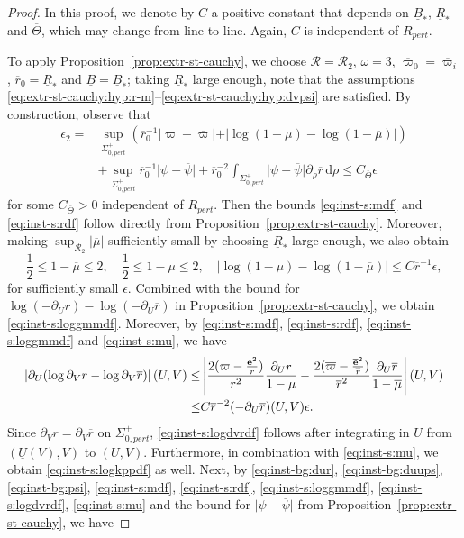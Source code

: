 \documentclass[10pt, reqno]{amsart}
\theoremstyle{definition}
\theoremstyle{remark}
\theoremstyle{conjecture}
\numberwithin{equation}{section}
\newcommand{\abs}[1]{\vert#1\vert}
\newcommand{\ud}{\mathrm{d}}
\newcommand{\rd}{\partial}
\newcommand{\0}{\emptyset}
\newcommand{\eps}{\epsilon}
\newcommand{\Sgm}{\Sigma}
\newcommand{\Tht}{\Theta}
\newcommand{\omg}{\omega}
\newcommand{\bfe}{{\bf e}}
\newcommand{\calR}{\mathcal R}
\newcommand{\e}{\bfe}							%
\newcommand{\psibg}{\overline{\psi}}				%
\newcommand{\rbg}{\overline{r}}					%
\newcommand{\varpibg}{\overline{\varpi}}				%
\newcommand{\mubg}{\overline{\mu}}				%
\newcommand{\ebg}{\overline{\e}}					%
\newcommand{\Abs}[1]{\left\vert #1 \right\vert}
\begin{document}
\begin{proof}
In this proof, we denote by $C$ a positive constant that depends on $\underline{B}_{\ast}$, $\underline{R}_{\ast}
$ and $\overline{\Tht}$, which may change from line to line. Again, $C$ is independent of $R_{pert}$.

To apply Proposition~\ref{prop:extr-st-cauchy}, we choose $\underline{\calR} = \calR_{2}$, $\omg = 3$, $\varpibg_{0} = \varpibg_{i}$, $\rbg_{0} = \underline{R}_{\ast}$ and $\underline{B} = \underline{B}_{\ast}$; taking $\underline{R}_{\ast}$ large enough, note that the assumptions \eqref{eq:extr-st-cauchy:hyp:r-m}--\eqref{eq:extr-st-cauchy:hyp:dvpsi} are satisfied. By construction, observe that
\begin{align*}
	\eps_{2} = & \sup_{\Sgm_{0, pert}^{+}} \left( \rbg_{0}^{-1} \abs{\varpi - \varpibg} + \abs{\log (1-\mu) - \log (1-\mubg)} \right) \\
	& + \sup_{\Sgm_{0, pert}^{+}} \rbg_{0}^{-1} \abs{\psi - \psibg}  + \rbg_{0}^{-2} \int_{\Sgm_{0, pert}^{+}} \abs{\psi - \psibg} \rd_{\rho} \rbg \, \ud \rho 
	\leq C_{\overline{\Tht}} \eps
\end{align*}
for some $C_{\overline{\Tht}} > 0$ independent of $R_{pert}$. Then the bounds \eqref{eq:inst-s:mdf} and \eqref{eq:inst-s:rdf} follow directly from Proposition~\ref{prop:extr-st-cauchy}. Moreover, making $\sup_{\calR_{2}} \abs{\mubg}$ sufficiently small by choosing $\underline{R}_{\ast}$ large enough, we also obtain
\begin{equation} \label{eq:inst-s:mu}
	\frac{1}{2} \leq 1 - \mubg \leq 2, \quad \frac{1}{2} \leq 1 - \mu \leq 2, \quad \Abs{\log(1 - \mu) - \log(1 - \mubg)} \leq C \rbg^{-1} \eps,
\end{equation}
for sufficiently small $\eps$. Combined with the bound for $\log (-\rd_{U} r) - \log (-\rd_{U} \rbg)$ in Proposition~\ref{prop:extr-st-cauchy}, we obtain \eqref{eq:inst-s:loggmmdf}. Moreover, by \eqref{eq:inst-s:mdf}, \eqref{eq:inst-s:rdf}, \eqref{eq:inst-s:loggmmdf} and \eqref{eq:inst-s:mu}, we have
\begin{align*}
	\Abs{\rd_{U} (\log \rd_{V} r - \log \rd_{V} \rbg)} (U,V)
	\leq & \Abs{\frac{2 (\varpi - \frac{\e^{2}}{r})}{r^{2}} \frac{\rd_{U} r}{1-\mu} - \frac{2 (\varpibg - \frac{\ebg^{2}}{\rbg})}{\rbg^{2}} \frac{\rd_{U} \rbg}{1-\mubg}} (U,V) \\
	\leq & C \rbg^{-2} (- \rd_{U} \rbg) (U, V) \eps.
\end{align*}
Since $\rd_{V} r = \rd_{V} \rbg$ on $\Sgm_{0, pert}^{+}$, \eqref{eq:inst-s:logdvrdf} follows after integrating in $U$ from $(\underline{U}(V), V)$ to $(U, V)$. Furthermore, in combination with \eqref{eq:inst-s:mu}, we obtain \eqref{eq:inst-s:logkppdf} as well. Next, by \eqref{eq:inst-bg:dur}, \eqref{eq:inst-bg:duups}, \eqref{eq:inst-bg:psi}, \eqref{eq:inst-s:mdf}, \eqref{eq:inst-s:rdf}, \eqref{eq:inst-s:loggmmdf}, \eqref{eq:inst-s:logdvrdf}, \eqref{eq:inst-s:mu} and the bound for $\abs{\psi - \psibg}$ from Proposition~\ref{prop:extr-st-cauchy}, we have

\end{proof}
\end{document}

